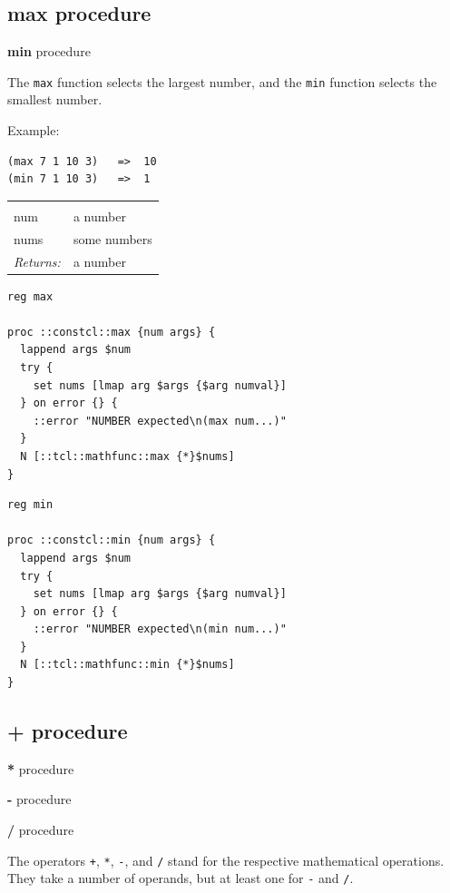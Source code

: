\documentclass[twoside,9pt]{report}
\begin{document}
\subsection{max procedure}
\label{max-procedure}


\textbf{min} procedure


The \texttt{max} function selects the largest number, and the \texttt{min} function selects the smallest number.


Example:

\begin{verbatim}
(max 7 1 10 3)   =>  10
(min 7 1 10 3)   =>  1
\end{verbatim}
\noindent\begin{tabular}{ |p{1.5cm} p{8cm}| }
\hline
\rowcolor[HTML]{CCCCCC} \multicolumn{2}{|l|}{\bf max, min (public)} \\
num & a number \\
nums & some numbers \\
\textit{Returns:} & a number \\
\hline
\end{tabular}
\begin{lstlisting}
reg max
 
proc ::constcl::max {num args} {
  lappend args $num
  try {
    set nums [lmap arg $args {$arg numval}]
  } on error {} {
    ::error "NUMBER expected\n(max num...)"
  }
  N [::tcl::mathfunc::max {*}$nums]
}
\end{lstlisting}
\begin{lstlisting}
reg min
 
proc ::constcl::min {num args} {
  lappend args $num
  try {
    set nums [lmap arg $args {$arg numval}]
  } on error {} {
    ::error "NUMBER expected\n(min num...)"
  }
  N [::tcl::mathfunc::min {*}$nums]
}
\end{lstlisting}
\subsection{+ procedure}
\label{+-procedure}


\textbf{*} procedure


\textbf{-} procedure


\textbf{/} procedure


The operators \texttt{+}, \texttt{*}, \texttt{-}, and \texttt{/} stand for the respective mathematical operations. They take a number of operands, but at least one for \texttt{-} and \texttt{/}.
\end{document}

